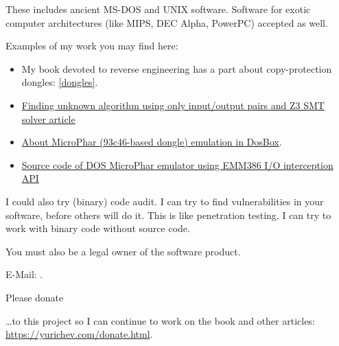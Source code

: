 These includes ancient MS-DOS and UNIX software. Software for exotic computer architectures (like MIPS, DEC Alpha, PowerPC) accepted as well.

Examples of my work you may find here:

\begin{itemize}
\item My book devoted to reverse engineering has a part about copy-protection dongles: \ref{dongles}.
\item \href{http://yurichev.com/writings/z3_rockey.pdf}{Finding unknown algorithm using only input/output pairs and Z3 SMT solver article}
\item \href{http://yurichev.com/blog/56/}{About MicroPhar (93c46-based dongle) emulation in DosBox}.
\item \href{http://conus.info/dongle/src/microph.asm}{Source code of DOS MicroPhar emulator using EMM386 I/O interception API}
\end{itemize}

\bigskip

I could also try (binary) code audit.
I can try to find vulnerabilities in your software, before others will do it.
This is like penetration testing.
I can try to work with binary code without source code.

You must also be a legal owner of the software product.

E-Mail: \GTT{\EMAIL}.

\bigskip

\huge Please donate
\normalsize

\bigskip

\dots to this project so I can continue to work on the book and other articles: \\
\url{https://yurichev.com/donate.html}.

\iffalse
\bigskip
\bigskip
\bigskip

\huge Attention: Opinion Poll
\normalsize

\bigskip
\bigskip
\bigskip

I have an idea to replace all the OllyDbg examples in the book with examples using some other debugger.
I have nothing against OllyDbg, but it has a GUI and uses small fonts, and the screenshots are somewhat unsuitable for the book.

Maybe I could use GDB, rada.re, WinDbg, or maybe some other console debugger?

What do you think about it?
Should I leave OllyDbg examples, or would radare examples would be OK?

E-Mail: \GTT{\EMAIL}.
\fi

